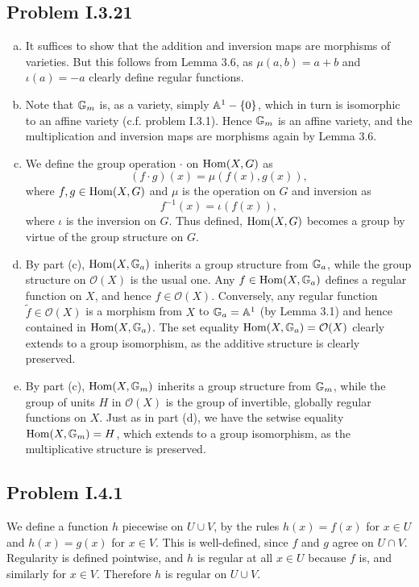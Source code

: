 \documentclass{mathnotes}
\begin{document}
\subsection*{Problem I.3.21}
\begin{enumerate}[(a)]
    \item It suffices to show that the addition and inversion maps are morphisms of varieties.
        But this follows from Lemma 3.6, as $\mu(a,b)=a+b$ and $\iota(a)=-a$ clearly define
        regular functions.
    \item Note that $\mathbb{G}_m$ is, as a variety, simply $\mathbb{A}^1-\{0\}$, which in turn is isomorphic to 
        an affine variety (c.f. problem I.3.1). Hence $\mathbb{G}_m$ is an affine variety, and the
        multiplication and inversion maps are morphisms again by Lemma 3.6.
    \item We define the group operation $\cdot$ on $\operatorname{Hom}(X,G)$ as
        \[(f\cdot g)(x)=\mu(f(x),g(x)),\]
        where $f,g\in\operatorname{Hom}(X,G)$ and $\mu$ is the operation on $G$ and inversion as
        \[f^{-1}(x)=\iota(f(x)),\]
        where $\iota$ is the inversion on $G$. Thus defined, $\operatorname{Hom}(X,G)$ becomes a group
        by virtue of the group structure on $G$.
    \item By part (c), $\operatorname{Hom}(X,\mathbb{G}_a)$ inherits a group structure from $\mathbb{G}_a$, while the group
        structure on $\mathcal{O}(X)$ is the usual one. Any $f\in\operatorname{Hom}(X,\mathbb{G}_a)$ defines a regular
        function on $X$, and hence $f\in\mathcal{O}(X)$. Conversely, any regular function
        $\tilde f\in\mathcal{O}(X)$ is a morphism from $X$ to $\mathbb{G}_a=\mathbb{A}^1$ (by Lemma 3.1) and
        hence contained in $\operatorname{Hom}(X,\mathbb{G}_a)$. The set equality $\operatorname{Hom}(X,\mathbb{G}_a)=\mathcal{O}(X)$ clearly
        extends to a group isomorphism, as the additive structure is clearly preserved.
    \item By part (c), $\operatorname{Hom}(X,\mathbb{G}_m)$ inherits a group structure from $\mathbb{G}_m$, while the group
        of units $H$ in $\mathcal{O}(X)$ is the group of invertible, globally regular functions
        on $X$. Just as in part (d), we have the setwise equality $\operatorname{Hom}(X,\mathbb{G}_m)=H$, which extends
        to a group isomorphism, as the multiplicative structure is preserved.
\end{enumerate}


\subsection*{Problem I.4.1}
We define a function $h$ piecewise on $U \cup V$, by the rules $h(x) = f(x)$ for $x \in U$ and
 $h(x) = g(x)$ for $x \in V$. This is well-defined, since $f$ and $g$ agree on $U \cap V$. Regularity 
is defined pointwise, and $h$ is regular at all $x\in U$ because $f$ is, and similarly for $x \in V$. 
Therefore $h$ is regular on $U \cup V$.
\end{document}

